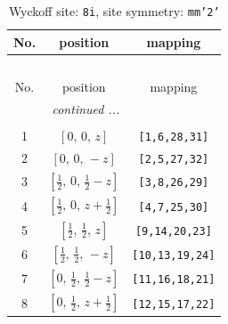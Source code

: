 \documentclass[fleqn,8pt]{jsarticle}
\begin{document}
\begin{longtable}{ccc}
\caption{Wyckoff site: {\tt 8i}, site symmetry: {\tt mm'2'}}
 \\
 \hline \hline
No. & position & mapping \\ \hline \endfirsthead

\multicolumn{2}{l}{\tablename\ \thetable{}} \\
 \hline \hline
No. & position & mapping \\ \hline \endhead

 \hline \hline
\multicolumn{2}{r}{\footnotesize\it continued ...} \\ \endfoot

 \hline \hline
\multicolumn{2}{r}{} \\ \endlastfoot

1 & $\left[ 0,\, 0,\, z \right]$ & {\tt [1,6,28,31]} \\ \hline
2 & $\left[ 0,\, 0,\, - z \right]$ & {\tt [2,5,27,32]} \\ \hline
3 & $\left[ \frac{1}{2},\, 0,\, \frac{1}{2} - z \right]$ & {\tt [3,8,26,29]} \\ \hline
4 & $\left[ \frac{1}{2},\, 0,\, z + \frac{1}{2} \right]$ & {\tt [4,7,25,30]} \\ \hline
5 & $\left[ \frac{1}{2},\, \frac{1}{2},\, z \right]$ & {\tt [9,14,20,23]} \\ \hline
6 & $\left[ \frac{1}{2},\, \frac{1}{2},\, - z \right]$ & {\tt [10,13,19,24]} \\ \hline
7 & $\left[ 0,\, \frac{1}{2},\, \frac{1}{2} - z \right]$ & {\tt [11,16,18,21]} \\ \hline
8 & $\left[ 0,\, \frac{1}{2},\, z + \frac{1}{2} \right]$ & {\tt [12,15,17,22]} \\
\end{longtable}
\renewcommand{\arraystretch}{1.2}
\end{document}
